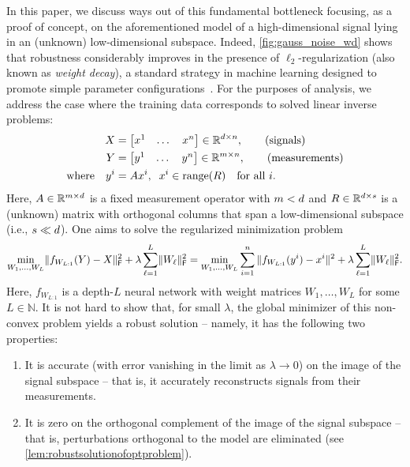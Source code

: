 In this paper, we discuss ways out of this fundamental bottleneck focusing, as a proof of concept, on the aforementioned model of a high-dimensional signal lying in an (unknown) low-dimensional subspace.
Indeed, \cref{fig:gauss_noise_wd} shows that robustness considerably improves in the presence of $\ell_2$-regularization (also known as \emph{weight decay}),
a standard strategy in machine learning designed to promote simple parameter configurations~\cite{krogh1991simple,bos1996using}.
For the purposes of analysis, we address the case where the training data corresponds to solved linear inverse problems:
	\begin{align}
		X     & = \begin{bmatrix} x^{1}                                                          & \dots & x^{n} \end{bmatrix} \in \mathbb{R}^{d \times n},  \tag{signals}\\
		Y     & = \begin{bmatrix} y^{1}                                                          & \dots & y^{n} \end{bmatrix} \in \mathbb{R}^{m \times n}, \tag{measurements}\\
		\text{where} \quad
		y^{i} & = A x^{i}, \;\; x^{i} \in \mathrm{range}(R) \quad \text{for all $i$.}
		\label{eq:dataset-measurements}
	\end{align}
Here, $A \in \mathbb{R}^{m \times d}$ is a fixed measurement operator with $m < d$ and $R \in \mathbb{R}^{d \times s}$
is a (unknown) matrix with orthogonal columns that span a low-dimensional subspace (i.e., $s \ll d$).
One aims to solve the regularized minimization problem
\begin{align}\label{eq:l2regprob1}
	\min_{W_1, \dots, W_{L}} \lVert f_{W_{L:1}}(Y)-X\rVert_{\mathsf{F}}^2 + \lambda \sum_{\ell =1}^L \lVert W_{\ell}\rVert_{\mathsf{F}}^2
  = \min_{W_1, \dots, W_{L}} \sum_{i=1}^n \|f_{W_{L:1}}(y^i) - x^i\|^2 + \lambda \sum_{\ell =1}^L \lVert W_{\ell}\rVert_{\mathsf{F}}^2.
\end{align}
Here, $f_{W_{L:1}}$ is a depth-$L$ neural network with weight matrices $W_1, \dots, W_L$ for some $L \in \mathbb{N}$. 
It is not hard to show that, for small $\lambda$, the global minimizer of this non-convex problem yields a robust solution -- namely, it
has the following two properties:
\begin{enumerate}
\item It is accurate (with error vanishing in the limit as $\lambda \rightarrow 0$) on the image of the signal subspace -- that is, it accurately reconstructs signals from their measurements.
	\item It is zero on the orthogonal complement of the image of the signal subspace -- that is, perturbations orthogonal to the model are eliminated (see \cref{lem:robustsolutionofoptproblem}).
\end{enumerate}
